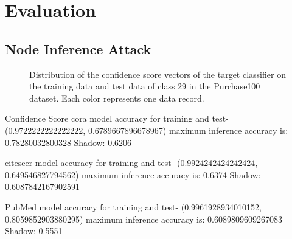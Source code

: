 \section{Evaluation}



\subsection{Node Inference Attack}


\begin{figure}
    \centering
    \begin{minipage}[b]{1\linewidth}
    \centering

    \end{minipage}
    \caption{Distribution of the confidence score vectors of the target classifier on the training data and test data of class 29 in the Purchase100 dataset. Each color represents one data record.}
    \label{fig:soft_label}
\end{figure}

Confidence Score
cora
model accuracy for training and test- (0.9722222222222222, 0.6789667896678967)
maximum inference accuracy is: 0.78280032800328
Shadow: 0.6206


citeseer
model accuracy for training and test- (0.9924242424242424, 0.649546827794562)
maximum inference accuracy is: 0.6374
Shadow: 0.6087842167902591

PubMed
model accuracy for training and test- (0.9961928934010152, 0.8059852903880295)
maximum inference accuracy is: 0.6089809609267083
Shadow: 0.5551

